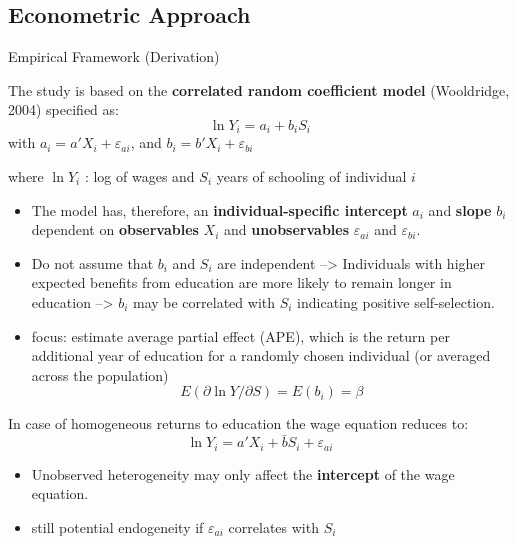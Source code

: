 \documentclass[10pt,ignorenonframetext,]{beamer}
\begin{document}
\hypertarget{econometric-approach}{%
\subsection{Econometric Approach}\label{econometric-approach}}

\begin{frame}[allowframebreaks]{Empirical Framework (Derivation)}
\protect\hypertarget{empirical-framework-derivation}{}

The study is based on the \textbf{correlated random coefficient model}
(Wooldridge, 2004) specified as: \[\ln Y_i = a_i + b_i S_i\] with
\(a_i = a'X_i + \varepsilon_{ai}\), and
\(b_i = b'X_i + \varepsilon_{bi}\)

where \(\ln Y_i\) : log of wages and \(S_i\) years of schooling of
individual \(i\)

\begin{itemize}
\item
  The model has, therefore, an \textbf{individual-specific intercept}
  \(a_i\) and \textbf{slope} \(b_i\) dependent on \textbf{observables}
  \(X_i\) and \textbf{unobservables} \(\varepsilon_{ai}\) and
  \(\varepsilon_{bi}\).
\item
  Do not assume that \(b_i\) and \(S_i\) are independent
  --\textgreater{} Individuals with higher expected benefits from
  education are more likely to remain longer in education
  --\textgreater{} \(b_i\) may be correlated with \(S_i\) indicating
  positive self-selection.
\item
  focus: estimate average partial effect (APE), which is the return per
  additional year of education for a randomly chosen individual (or
  averaged across the population)
  \[E(\partial \ln Y / \partial S) = E(b_i) = \beta\]
\end{itemize}

In case of homogeneous returns to education the wage equation reduces
to: \[\ln Y_i = a'X_i + \bar b S_i + \varepsilon_{ai}\]

\begin{itemize}
\item
  Unobserved heterogeneity may only affect the \textbf{intercept} of the
  wage equation.
\item
  still potential endogeneity if \(\varepsilon_{ai}\) correlates with
  \(S_i\)
\end{itemize}

\end{frame}
\end{document}
